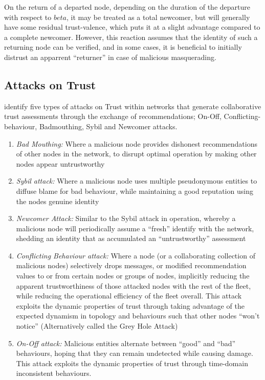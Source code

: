 On the return of a departed node, depending on the duration of the departure with respect to $beta$, it may be treated as a total newcomer, but will generally have some residual trust-valence, which puts it at a slight advantage compared to a complete newcomer. 
However, this reaction assumes that the identity of such a returning node can be verified, and in some cases, it is beneficial to initially distrust an apparrent ``returner'' in case of malicious masquerading.

\subsection{Attacks on Trust}

\citet{Liu2010} identify five types of attacks on Trust within networks that generate collaborative trust assessments through the exchange of recommendations; On-Off, Conflicting-behaviour, Badmouthing, Sybil and Newcomer attacks.

\begin{enumerate}
	\item \emph{Bad Mouthing:} Where a malicious node provides dishonest recommendations of other nodes in the network, to disrupt optimal operation  by making other nodes appear untrustworthy
	\item \emph{Sybil attack:} Where a malicious node uses multiple pseudonymous entities to diffuse blame for bad behaviour, while maintaining a good reputation using the nodes genuine identity
	\item \emph{Newcomer Attack:} Similar to the Sybil attack in operation, whereby a malicious node will periodically assume a ``fresh'' identify with the network, shedding an identity that as accumulated an ``untrustworthy'' assessment
	\item \emph{Conflicting Behaviour attack:} Where a node (or a collaborating collection of malicious nodes) selectively drops messages, or modified recommendation values to or from certain nodes or groups of nodes, implicitly reducing the apparent trustworthiness of those attacked nodes with the rest of the fleet, while reducing the operational efficiency of the fleet overall.  This attack exploits the dynamic properties of trust through taking advantage of the expected dynamism in topology and behaviours such that other nodes ``won't notice'' (Alternatively called the Grey Hole Attack)
	\item \emph{On-Off attack:} Malicious entities alternate between ``good'' and ``bad'' behaviours, hoping that they can remain undetected while causing damage. This attack exploits the dynamic properties of trust through time-domain inconsistent behaviours.
\end{enumerate} 

